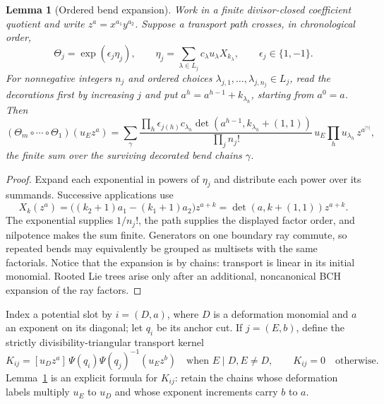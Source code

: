 \documentclass[11pt]{amsart}
\newtheorem{lemma}[theorem]{Lemma}
\theoremstyle{definition}
\theoremstyle{remark}
\begin{document}
\begin{lemma}[Ordered bend expansion]
\label{lem:bendchain}
Work in a finite divisor-closed coefficient quotient and write
$z^a=x^{a_1}y^{a_2}$.  Suppose a transport path crosses, in chronological
order,
\[
 \Theta_j=\exp(\!\epsilon_j\eta_j),\qquad
 \eta_j=\sum_{\lambda\in L_j}c_\lambda u_\lambda X_{k_\lambda},
 \qquad \epsilon_j\in\{1,-1\}.
\]
For nonnegative integers $n_j$ and ordered choices
$\lambda_{j,1},\ldots,\lambda_{j,n_j}\in L_j$, read the decorations first by
increasing $j$ and put $a^h=a^{h-1}+k_{\lambda_h}$, starting from $a^0=a$.
Then
\begin{equation}
\label{eq:bendchain}
 (\Theta_m\circ\cdots\circ\Theta_1)(u_Ez^a)
 =\sum_\gamma
 \frac{\prod_h\epsilon_{j(h)}c_{\lambda_h}
  \det(a^{h-1},k_{\lambda_h}+(1,1))}
 {\prod_j n_j!}\,
 u_E\prod_hu_{\lambda_h}\,z^{a^{|\gamma|}},
\end{equation}
the finite sum over the surviving decorated bend chains $\gamma$.
\end{lemma}

\begin{proof}
Expand each exponential in powers of $\eta_j$ and distribute each power over
its summands.  Successive applications use
\[
 X_k(z^a)=\bigl((k_2+1)a_1-(k_1+1)a_2\bigr)z^{a+k}
 =\det(a,k+(1,1))z^{a+k}.
\]
The exponential supplies $1/n_j!$, the path supplies the displayed factor
order, and nilpotence makes the sum finite.  Generators on one boundary ray
commute, so repeated bends may equivalently be grouped as multisets with the
same factorials.  Notice that the expansion is by chains: transport is linear
in its initial monomial.  Rooted Lie trees arise only after an additional,
noncanonical BCH expansion of the ray factors.  \qedhere
\end{proof}

Index a potential slot by $i=(D,a)$, where $D$ is a deformation monomial and
$a$ an exponent on its diagonal; let $q_i$ be its anchor cut.  If
$j=(E,b)$, define the strictly divisibility-triangular transport kernel
\begin{equation}
\label{eq:transportkernel}
 K_{ij}=
 [u_Dz^a]\,\Psi(q_i)\Psi(q_j)^{-1}(u_Ez^b)
 \quad\text{when }E\mid D, E\ne D,
 \qquad K_{ij}=0\quad\text{otherwise}.
\end{equation}
Lemma~\ref{lem:bendchain} is an explicit formula for $K_{ij}$: retain the
chains whose deformation labels multiply $u_E$ to $u_D$ and whose exponent
increments carry $b$ to $a$.
\end{document}
